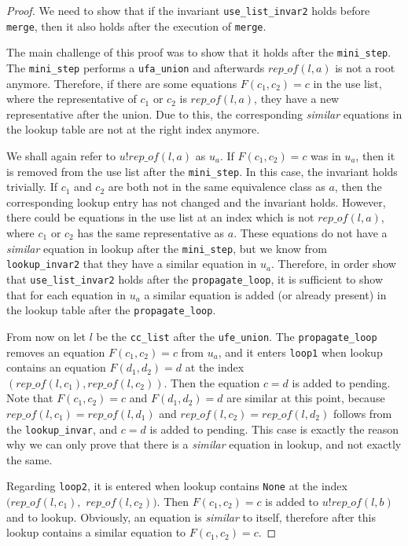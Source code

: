 \begin{proof}
We need to show that if the invariant \lstinline{use_list_invar2} holds before \lstinline{merge}, then it also holds after the execution of \lstinline|merge|.

The main challenge of this proof was to show that it holds after the \lstinline|mini_step|.
The \lstinline|mini_step| performs a \lstinline|ufa_union| and afterwards $rep\_of(l, a)$ is not a root anymore.
Therefore, if there are some equations $F(c_1, c_2) = c$ in the use list, where the representative of $c_1$ or $c_2$ is $rep\_of(l,a)$, they have a new representative after the union. Due to this, the corresponding \emph{similar} equations in the lookup table are not at the right index anymore.

We shall again refer to $u ! rep\_of (l, a)$ as $u_a$.
If $F(c_1, c_2) = c$ was in $u_a$, then it is removed from the use list after the \lstinline|mini_step|. In this case, the invariant holds trivially.
If $c_1$ and $c_2$ are both not in the same equivalence class as $a$, then the corresponding lookup entry has not changed and the invariant holds.
However, there could be equations in the use list at an index which is not $rep\_of(l, a)$, where $c_1$ or $c_2$ has the same representative as $a$. These equations do not have a \emph{similar} equation in lookup after the \lstinline{mini_step}, but we know from \lstinline{lookup_invar2} that they have a similar equation in $u_a$.
Therefore, in order show that \lstinline{use_list_invar2} holds after the \lstinline{propagate_loop}, it is sufficient to show that for each equation in $u_a$ a similar equation is added (or already present) in the lookup table after the \lstinline{propagate_loop}.

From now on let $l$ be the \lstinline{cc_list} after the \lstinline{ufe_union}.
The \lstinline{propagate_loop} removes an equation $F(c_1, c_2) = c$ from $u_a$, and it enters \lstinline{loop1} when lookup contains an equation $F(d_1, d_2) = d$ at the index $(rep\_of(l, c_1), rep\_of(l, c_2))$.
Then the equation $c = d$ is added to pending. Note that $F(c_1, c_2) = c$ and $F(d_1, d_2) = d$ are similar at this point, because $rep\_of(l, c_1) = rep\_of(l, d_1)$ and $rep\_of(l, c_2) = rep\_of(l, d_2)$ follows from the \lstinline{lookup_invar}, and $c = d$ is added to pending.
This case is exactly the reason why we can only prove that there is a \emph{similar} equation in lookup, and not exactly the same.

Regarding \lstinline{loop2}, it is entered when lookup contains \lstinline{None} at the index
$(rep\_of(l, c_1),$ $rep\_of(l, c_2))$. Then $F(c_1, c_2) = c$ is added to $u ! rep\_of(l, b)$ and to lookup. Obviously, an equation is \emph{similar} to itself, therefore after this lookup contains a similar equation to $F(c_1, c_2) = c$.
\end{proof}

